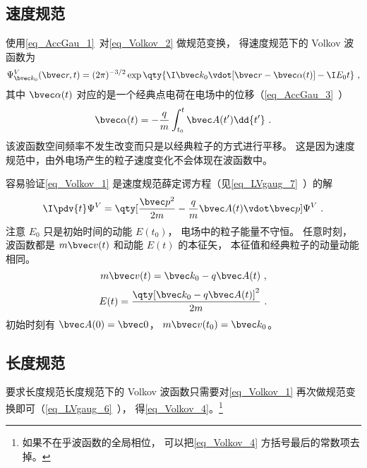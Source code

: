 \subsection{速度规范}
使用\autoref{eq_AccGau_1}~对\autoref{eq_Volkov_2} 做规范变换， 得速度规范下的 Volkov 波函数为
\begin{equation}\label{eq_Volkov_1}
\Psi_{\bvec k_0}^V(\bvec r, t) = (2\pi)^{-3/2} \exp\qty{\I \bvec k_0 \vdot [\bvec r - \bvec \alpha(t)] - \I E_0 t}~,
\end{equation}
其中 $\bvec \alpha(t)$ 对应的是一个经典点电荷在电场中的位移（\autoref{eq_AccGau_3}~）
\begin{equation}
\bvec \alpha(t) = -\frac{q}{m} \int_{t_0}^t \bvec A(t') \dd{t'}~.
\end{equation}
该波函数空间频率不发生改变而只是以经典粒子的方式进行平移。 这是因为速度规范中，由外电场产生的粒子速度变化不会体现在波函数中。

容易验证\autoref{eq_Volkov_1} 是速度规范薛定谔方程（见\autoref{eq_LVgaug_7}~）的解
\begin{equation}
\I \pdv{t} \Psi^V = \qty[\frac{\bvec p^2}{2m} - \frac{q}{m}\bvec A(t) \vdot \bvec p] \Psi^V~.
\end{equation}
注意 $E_0$ 只是初始时间的动能 $E(t_0)$， 电场中的粒子能量不守恒。 任意时刻， 波函数都是 $m\bvec v(t)$ 和动能 $E(t)$ 的本征矢， 本征值和经典粒子的动量动能相同。
\begin{equation}
m\bvec v(t) = \bvec k_0 - q\bvec A(t)~,
\end{equation}
\begin{equation}
E(t) = \frac{\qty[\bvec k_0 - q\bvec A(t)]^2}{2m}~.
\end{equation}
初始时刻有 $\bvec A(0) = \bvec 0$， $m\bvec v(t_0) = \bvec k_0$。

\subsection{长度规范}
要求长度规范长度规范下的 Volkov 波函数只需要对\autoref{eq_Volkov_1} 再次做规范变换即可（\autoref{eq_LVgaug_6}~）， 得\autoref{eq_Volkov_4}。\footnote{如果不在乎波函数的全局相位， 可以把\autoref{eq_Volkov_4} 方括号最后的常数项去掉。}
